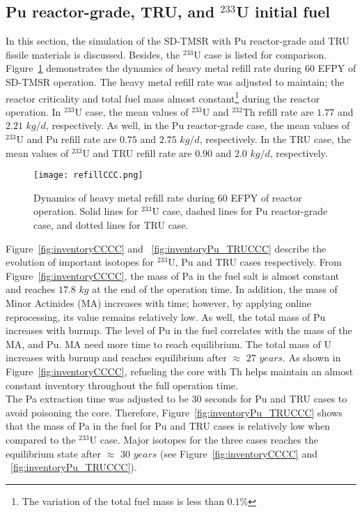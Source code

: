 \subsection{Pu reactor-grade, TRU, and $^{233}$U initial fuel}

In this section, the simulation of the SD-TMSR with Pu reactor-grade and TRU fissile materials is discussed. Besides, the $^{233}$U case is listed for comparison.\\
Figure~\ref{fig:refillCCC} demonstrates the dynamics of heavy metal refill rate during 60 \gls{EFPY} of SD-TMSR operation. The heavy metal refill rate was adjusted to maintain; the reactor criticality and total fuel mass almost constant\footnote{The variation of the total fuel mass is less than $0.1\%$} during the reactor operation. In $^{233}$U case, the mean values of $^{233}$U and $^{232}$Th refill rate are $1.77$ and $2.21$ $kg/d$, respectively. As well, in the Pu reactor-grade case, the mean values of $^{233}$U and Pu refill rate are $0.75$ and $2.75$ $kg/d$, respectively. In the TRU case, the mean values of $^{233}$U and TRU refill rate are $0.90$ and $2.0$ $kg/d$, respectively.

\begin{figure}
	\centering
	\texttt{[image: refillCCC.png]}
	\caption{Dynamics of heavy metal refill rate during 60 \gls{EFPY} of reactor operation. Solid lines for $^{233}$U case, dashed lines for Pu reactor-grade case, and dotted lines for TRU case.}
	\label{fig:refillCCC}
\end{figure}

Figure~\ref{fig:inventoryCCCC} and ~\ref{fig:inventoryPu_TRUCCC} describe the evolution of important isotopes for $^{233}$U, Pu and TRU cases respectively.
From Figure~\ref{fig:inventoryCCCC}, the mass of Pa in the fuel salt is almost constant and reaches $17.8$  $kg$ at the end of the operation time. In addition, the mass of Minor Actinides (MA) increases with time; however, by applying online reprocessing, its value remains relatively low. As well, the total mass of Pu increases with burnup. The level of Pu in the fuel correlates with the mass of the MA, and Pu. MA need more time to reach equilibrium. The total mass of U increases with burnup and reaches equilibrium after $\approx$ $27$ $years$. As shown in Figure~\ref{fig:inventoryCCCC}, refueling the core with Th helps maintain an almost constant inventory throughout the full operation time.\\
The Pa extraction time was adjusted to be 30 seconds for Pu and TRU cases to avoid poisoning the core. Therefore, Figure~\ref{fig:inventoryPu_TRUCCC} shows that the mass of Pa in the fuel for Pu and TRU cases is relatively low when compared to the $^{233}$U case.
Major isotopes for the three cases reaches the equilibrium state after $\approx$ $30$ $years$ (see Figure~\ref{fig:inventoryCCCC} and ~\ref{fig:inventoryPu_TRUCCC}).

